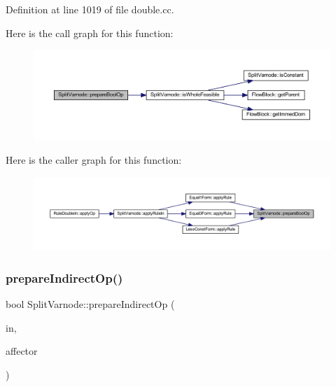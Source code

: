 Definition at line 1019 of file double.\+cc.

Here is the call graph for this function\+:
\nopagebreak
\begin{figure}[H]
\begin{center}
\leavevmode
\includegraphics[width=350pt]{class_split_varnode_ab869c695dd00e22e544be6f0090178af_cgraph}
\end{center}
\end{figure}
Here is the caller graph for this function\+:
\nopagebreak
\begin{figure}[H]
\begin{center}
\leavevmode
\includegraphics[width=350pt]{class_split_varnode_ab869c695dd00e22e544be6f0090178af_icgraph}
\end{center}
\end{figure}
\mbox{\label{class_split_varnode_a11bfb0c446ec6ea8d2fdd25c9481a801}} 
\subsubsection{\texorpdfstring{prepareIndirectOp()}{prepareIndirectOp()}}
{\footnotesize\ttfamily bool Split\+Varnode\+::prepare\+Indirect\+Op (\begin{DoxyParamCaption}\item[{\mbox{\hyperlink{class_split_varnode}{Split\+Varnode}} \&}]{in,  }\item[{\mbox{\hyperlink{class_pcode_op}{Pcode\+Op}} $\ast$}]{affector }\end{DoxyParamCaption})\hspace{0.3cm}{\ttfamily [static]}}



